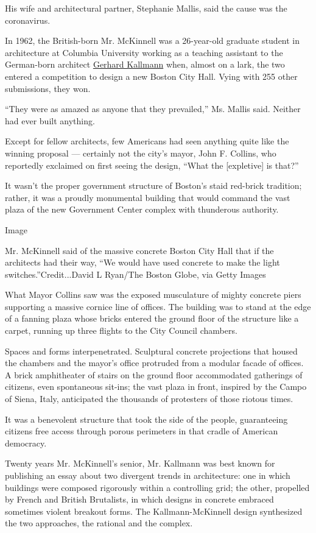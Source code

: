 His wife and architectural partner, Stephanie Mallis, said the cause was
the coronavirus.

In 1962, the British-born Mr. McKinnell was a 26-year-old graduate
student in architecture at Columbia University working as a teaching
assistant to the German-born architect
\href{https://www.nytimes.com/2012/06/25/arts/design/gerhard-kallmann-architect-dies-at-97.html}{Gerhard
Kallmann} when, almost on a lark, the two entered a competition to
design a new Boston City Hall. Vying with 255 other submissions, they
won.

``They were as amazed as anyone that they prevailed,'' Ms. Mallis said.
Neither had ever built anything.

Except for fellow architects, few Americans had seen anything quite like
the winning proposal --- certainly not the city's mayor, John F.
Collins, who reportedly exclaimed on first seeing the design, ``What the
{[}expletive{]} is that?''

It wasn't the proper government structure of Boston's staid red-brick
tradition; rather, it was a proudly monumental building that would
command the vast plaza of the new Government Center complex with
thunderous authority.

Image

Mr. McKinnell said of the massive concrete Boston City Hall that if the
architects had their way, ``We would have used concrete to make the
light switches.''Credit...David L Ryan/The Boston Globe, via Getty
Images

What Mayor Collins saw was the exposed musculature of mighty concrete
piers supporting a massive cornice line of offices. The building was to
stand at the edge of a fanning plaza whose bricks entered the ground
floor of the structure like a carpet, running up three flights to the
City Council chambers.

Spaces and forms interpenetrated. Sculptural concrete projections that
housed the chambers and the mayor's office protruded from a modular
facade of offices. A brick amphitheater of stairs on the ground floor
accommodated gatherings of citizens, even spontaneous sit-ins; the vast
plaza in front, inspired by the Campo of Siena, Italy, anticipated the
thousands of protesters of those riotous times.

It was a benevolent structure that took the side of the people,
guaranteeing citizens free access through porous perimeters in that
cradle of American democracy.

Twenty years Mr. McKinnell's senior, Mr. Kallmann was best known for
publishing an essay about two divergent trends in architecture: one in
which buildings were composed rigorously within a controlling grid; the
other, propelled by French and British Brutalists, in which designs in
concrete embraced sometimes violent breakout forms. The
Kallmann-McKinnell design synthesized the two approaches, the rational
and the complex.

